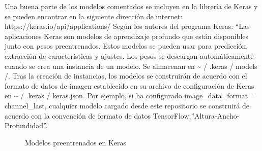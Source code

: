 \documentclass[
  a4paper,
  DIV=11,
  numbers=noendperiod]{scrreprt}
\begin{document}
Una buena parte de los modelos comentados se incluyen en la librería de
Keras y se pueden encontrar en la siguiente dirección de internet:
https://keras.io/api/applications/ Según los autores del programa Keras:
``Las aplicaciones Keras son modelos de aprendizaje profundo que están
disponibles junto con pesos preentrenados. Estos modelos se pueden usar
para predicción, extracción de características y ajustes. Los pesos se
descargan automáticamente cuando se crea una instancia de un modelo. Se
almacenan en \textasciitilde{} / .keras / models /. Tras la creación de
instancias, los modelos se construirán de acuerdo con el formato de
datos de imagen establecido en su archivo de configuración de Keras en
\textasciitilde{} / .keras / keras.json. Por ejemplo, si ha configurado
image\_data\_format = channel\_last, cualquier modelo cargado desde este
repositorio se construirá de acuerdo con la convención de formato de
datos TensorFlow,''Altura-Ancho-Profundidad''.

\begin{figure}


\caption{\label{fig-modelos-entrenados}Modelos preentrenados en Keras}

\end{figure}%
\end{document}
